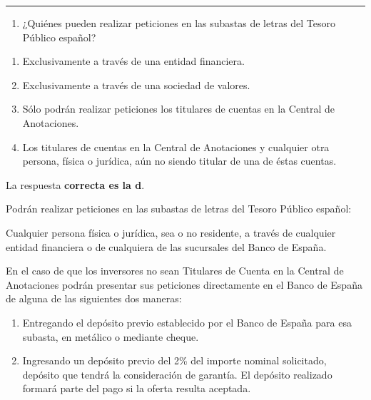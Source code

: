\documentclass[
  letterpaper,
  DIV=11,
  numbers=noendperiod]{scrreprt}
\providecommand{\tightlist}{%
  \setlength{\itemsep}{0pt}\setlength{\parskip}{0pt}}\usepackage{longtable,booktabs,array}
\begin{document}
\begin{center}\rule{0.5\linewidth}{0.5pt}\end{center}

\begin{enumerate}
\def\labelenumi{\arabic{enumi}.}
\setcounter{enumi}{2}
\tightlist
\item
  ¿Quiénes pueden realizar peticiones en las subastas de letras del
  Tesoro Público español?
\end{enumerate}

\begin{enumerate}
\def\labelenumi{\alph{enumi}.}
\item
  Exclusivamente a través de una entidad financiera.
\item
  Exclusivamente a través de una sociedad de valores.
\item
  Sólo podrán realizar peticiones los titulares de cuentas en la Central
  de Anotaciones.
\item
  Los titulares de cuentas en la Central de Anotaciones y cualquier otra
  persona, física o jurídica, aún no siendo titular de una de éstas
  cuentas.
\end{enumerate}

\begin{tcolorbox}[enhanced jigsaw, left=2mm, opacityback=0, colback=white, breakable, arc=.35mm, bottomrule=.15mm, rightrule=.15mm, toprule=.15mm, leftrule=.75mm, colframe=quarto-callout-tip-color-frame]
\begin{minipage}[t]{5.5mm}
\textcolor{quarto-callout-tip-color}{\faLightbulb}
\end{minipage}%
\begin{minipage}[t]{\textwidth - 5.5mm}

La respuesta \textbf{correcta es la d}.

Podrán realizar peticiones en las subastas de letras del Tesoro Público
español:

Cualquier persona física o jurídica, sea o no residente, a través de
cualquier entidad financiera o de cualquiera de las sucursales del Banco
de España.

En el caso de que los inversores no sean Titulares de Cuenta en la
Central de Anotaciones podrán presentar sus peticiones directamente en
el Banco de España de alguna de las siguientes dos maneras:

\begin{enumerate}
\def\labelenumi{\arabic{enumi}.}
\item
  Entregando el depósito previo establecido por el Banco de España para
  esa subasta, en metálico o mediante cheque.
\item
  Ingresando un depósito previo del 2\% del importe nominal solicitado,
  depósito que tendrá la consideración de garantía. El depósito
  realizado formará parte del pago si la oferta resulta aceptada.
\end{enumerate}

\end{minipage}%
\end{tcolorbox}
\end{document}

